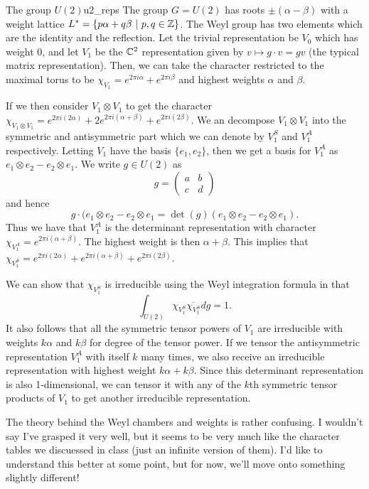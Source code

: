 \begin{ex}{The group $U(2)$}{u2_reps}
    The group $G=U(2)$ has roots $\pm (\alpha-\beta)$ with a weight lattice $L^* = \{p\alpha + q\beta ~\vert~ p,q\in \mathbb{Z}\}$. The Weyl group has two elements which are the identity and the reflection. Let the trivial representation be $V_0$ which has weight 0, and let $V_1$ be the $\mathbb{C}^2$ representation given by $v\mapsto g\cdot v=gv$ (the typical matrix representation).  Then, we can take the character restricted to the maximal torus to be $\chi_{V_1}=e^{2\pi i \alpha}+e^{2\pi i \beta}$ and highest weights $\alpha$ and $\beta$.  
    
    If we then consider $V_1\otimes V_1$ to get the character $\chi_{V_1\otimes V_1}=e^{2\pi i (2\alpha)}+2e^{2\pi i (\alpha+\beta)}+e^{2\pi i (2\beta)}$. We an decompose $V_1\otimes V_1$ into the symmetric and antisymmetric part which we can denote by $V_1^S$ and $V_1^A$ respectively.  Letting $V_1$ have the basis $\{e_1,e_2\}$, then we get a basis for $V_1^A$ as $e_1 \otimes e_2 - e_2 \otimes e_1$. We write $g\in U(2)$ as
    \[
    g=\begin{pmatrix} a & b \\ c & d \end{pmatrix}
    \]
    and hence 
    \[
    g\cdot (e_1 \otimes e_2 -e_2 \otimes e_1= \det(g)(e_1\otimes e_2 -e_2\otimes e_1).
    \]
    Thus we have that $V_1^A$ is the determinant representation with character $\chi_{V_1^A}=e^{2\pi i (\alpha+\beta)}$.  The highest weight is then $\alpha+\beta$.  This implies that $\chi_{V_1^S}=e^{2\pi i (2\alpha)}+e^{2\pi i (\alpha+\beta)}+e^{2\pi i(2\beta)}$. 
    
    We can show that $\chi_{V_1^S}$ is irreducible using the Weyl integration formula in that
    \[
    \int_{U(2)}\chi_{V_1^S}\overline{\chi_{V_1^S}}dg=1.
    \]
    It also follows that all the symmetric tensor powers of $V_1$ are irreducible with weights $k\alpha$ and $k\beta$ for degree of the tensor power. If we tensor the antisymmetric representation $V_1^A$ with itself $k$ many times, we also receive an irreducible representation with highest weight $k\alpha+k\beta$. Since this determinant representation is also 1-dimensional, we can tensor it with any of the $k$th symmetric tensor products of $V_1$ to get another irreducible representation.
\end{ex}

The theory behind the Weyl chambers and weights is rather confusing. I wouldn't say I've grasped it very well, but it seems to be very much like the character tables we discuessed in class (just an infinite version of them).  I'd like to understand this better at some point, but for now, we'll move onto something slightly different!





